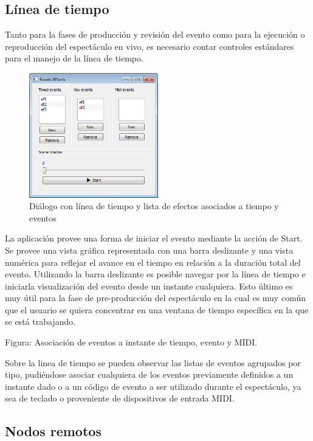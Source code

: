 \subsection{Línea de tiempo}

Tanto para la fases de producción y revisión del evento como para la ejecución o reproducción del espectáculo en vivo, es necesario contar controles estándares para el manejo de la línea de tiempo.

\begin{figure}[H]
  \centering
    \includegraphics[width=0.5\textwidth]{./Cap5_vmt/vmt_events_effects.png}
  \caption{Diálogo con línea de tiempo y lista de efectos asociados a tiempo y eventos}
  \label{fig:VMT-Timeline}
\end{figure}

La aplicación provee una forma de iniciar el evento mediante la acción de Start. Se provee una vista gráfica representada con una barra deslizante y una vista numérica para reflejar el avance en el tiempo en relación a la duración total del evento. Utilizando la barra deslizante es posible navegar por la línea de tiempo e iniciarla visualización del evento desde un instante cualquiera. Esto último es muy útil para la fase de pre-producción del espectáculo en la cual es muy común que el usuario se quiera concentrar en una ventana de tiempo específica en la que se está trabajando.


Figura: Asociación de eventos a instante de tiempo, evento y MIDI.

Sobre la linea de tiempo se pueden observar las listas de eventos agrupados por tipo, pudiéndose asociar cualquiera de los eventos previamente definidos a un instante dado o a un código de evento a ser utilizado durante el espectáculo, ya sea de teclado o proveniente de dispositivos de entrada MIDI.

\subsection{Nodos remotos}

